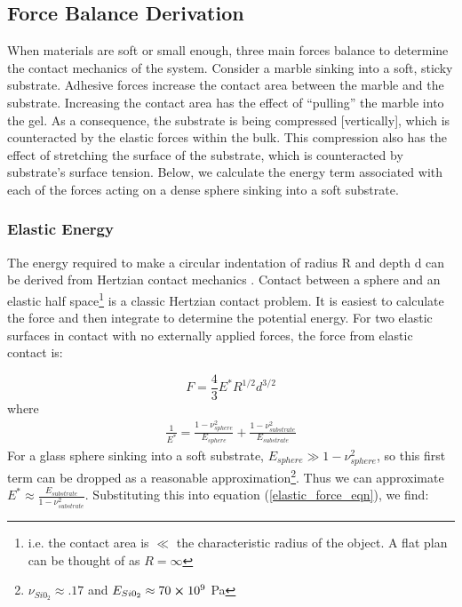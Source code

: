 \subsection{Force Balance Derivation}
When materials are soft or small enough, three main forces balance to determine the contact mechanics of the system. Consider a marble sinking into a soft, sticky substrate. Adhesive forces increase the contact area between the marble and the substrate. Increasing the contact area has the effect of ``pulling'' the marble into the gel. As a consequence, the substrate is being compressed [vertically], which is counteracted by the elastic forces within the bulk. This compression also has the effect of stretching the surface of the substrate, which is counteracted by substrate's surface tension. Below, we calculate the energy term associated with each of the forces acting on a dense sphere sinking into a soft substrate. 

\subsubsection{Elastic Energy}
The energy required to make a circular indentation of radius R and depth d can be derived from Hertzian contact mechanics \cite{hertz1882uber, style2013surface,cao2016nanoparticles}. Contact between a sphere and an elastic half space\footnote{i.e. the contact area is $ \ll $ the characteristic radius of the object. A flat plan can be thought of as $ R = \infty $}   is a classic Hertzian contact problem. It is easiest to calculate the force and then integrate to determine the potential energy. For two elastic surfaces in contact with no externally applied forces, the force from elastic contact is:

\begin{equation}
F = \frac{4}{3}E^*R^{1/2}d^{3/2}
\label{elastic_force_eqn}
\end{equation} 
where 
\begin{align*}
\frac{1}{E^*} = \frac{1-\nu_{sphere}^2}{E_{sphere}} + \frac{1-\nu_{substrate}^2}{E_{substrate}} 
\end{align*}
For a glass sphere sinking into a soft substrate, $ E_{sphere} \gg 1-\nu_{sphere}^2 $, so this first term can be dropped as a reasonable approximation\footnote{$\nu_{Si0_2} \approx .17 $ and $ E_{Si0_2} \approx 70 \cross 10^9 $ Pa}. Thus we can approximate $ E^* \approx \frac{E_{substrate}}{1-\nu_{substrate}^2} $. Substituting this into equation (\ref{elastic_force_eqn}), we find:

